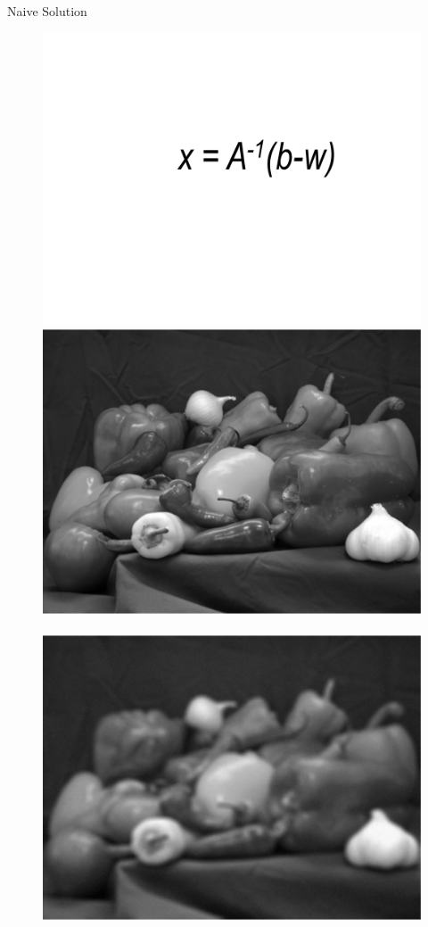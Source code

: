 \documentclass[12pt]{beamer}
\begin{document}
\begin{frame}{Naive Solution}
\begin{figure}
\centering
\includegraphics[scale=0.4]{naive2} \\[2ex]
\includegraphics[scale=0.2]{fig1} \,
\includegraphics[scale=0.2]{fig4} \,

\end{figure}
\end{frame}
\end{document}
